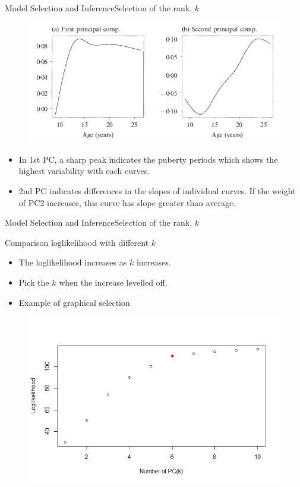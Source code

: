 \documentclass{beamer}
\begin{document}
\begin{frame}{Model Selection and Inference}{Selection of the rank, $k$}
	\begin{figure}[h] %
		\begin{center}
			\includegraphics[width=0.7\linewidth]{img/8.png}
		\end{center}
		\label{fig:long}
		\label{fig:onecol}
	\end{figure}
	\begin{itemize}
		\item {
			In 1st PC, a sharp peak indicates the puberty periods which shows the highest variability with each curves. 
		}
		\item {
			2nd PC indicates differences in the slopes of individual curves. If the weight of PC2 increases, this curve has slope greater than average.
		}
	\end{itemize}
\end{frame}

\begin{frame}{Model Selection and Inference}{Selection of the rank, $k$}
	\begin{block}{Comparison loglikelihood with different $k$}
		\begin{itemize}
			\item {
				The loglikelihood increases as $k$ increases.
			}
			\item {
				Pick the $k$ when the increase levelled off.
			}
			\item {
				Example of graphical selection
			}
		\end{itemize}
		\begin{figure}[h] %
			\begin{center}
				\includegraphics[width=0.6\linewidth]{img/9.png}
			\end{center}
			\label{fig:long}
			\label{fig:onecol}
		\end{figure}
	\end{block}
\end{frame}
\end{document}
